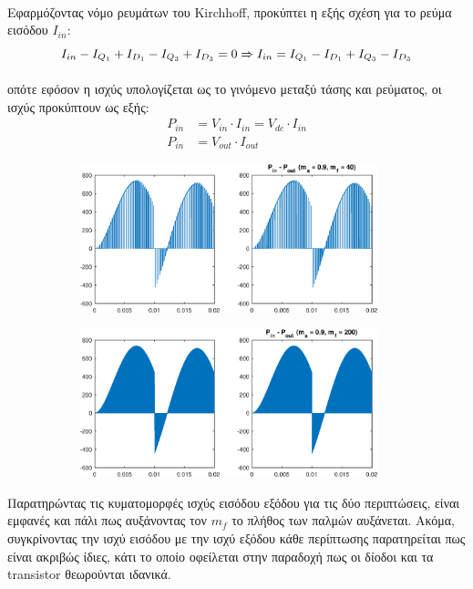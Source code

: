 \noindent\\
Εφαρμόζοντας νόμο ρευμάτων του Kirchhoff, προκύπτει η εξής σχέση για το ρεύμα εισόδου $I_{in}$:
\begin{equation}
	I_{in} - I_{Q_1} + I_{D_1} - I_{Q_3} + I_{D_3} = 0 \xRightarrow{} I_{in} = I_{Q_1} - I_{D_1} + I_{Q_3} - I_{D_3} 	
\end{equation}

οπότε εφόσον η ισχύς υπολογίζεται ως το γινόμενο μεταξύ τάσης και ρεύματος, οι ισχύς προκύπτουν ως εξής:
\begin{align*}
	P_{in} &= V_{in} \cdot I_{in} = V_{dc} \cdot I_{in}\\
	P_{in} &= V_{out} \cdot I_{out}
\end{align*}
\begin{figure}[h!]
	\begin{subfigure}{0.49\textwidth}
		\centering
		\includegraphics[width=0.95\textwidth]{Images/P_40}
	\end{subfigure}
	\begin{subfigure}{0.49\textwidth}
		\centering
		\includegraphics[width=0.95\textwidth]{Images/P_200}
	\end{subfigure}
\end{figure}
\noindent
Παρατηρώντας τις κυματομορφές ισχύς εισόδου εξόδου για τις δύο περιπτώσεις, είναι εμφανές και πάλι πως αυξάνοντας τον $m_f$ το πλήθος των παλμών αυξάνεται. Ακόμα, συγκρίνοντας την ισχύ εισόδου με την ισχύ εξόδου κάθε περίπτωσης παρατηρείται πως είναι ακριβώς ίδιες, κάτι το οποίο οφείλεται στην παραδοχή πως οι δίοδοι και τα transistor θεωρούνται ιδανικά.


